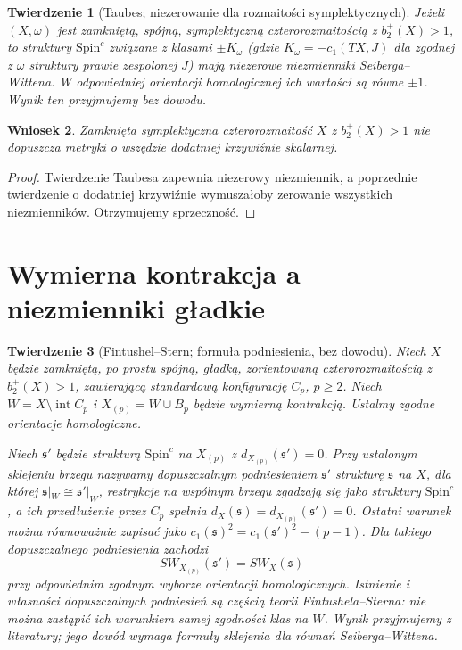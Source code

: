 \documentclass[11pt,a4paper]{report}
\numberwithin{equation}{section}
\theoremstyle{plain}
\newtheorem{twierdzenie}{Twierdzenie}[section]
\newtheorem{wniosek}[twierdzenie]{Wniosek}
\theoremstyle{definition}
\theoremstyle{remark}
\begin{document}
\begin{twierdzenie}[Taubes; niezerowanie dla rozmaitości symplektycznych]
\label{thm:tg-sw-taubes}
Jeżeli $(X,\omega)$ jest zamkniętą, spójną,
symplektyczną czterorozmaitością z $b_2^+(X)>1$,
to struktury $\mathrm{Spin}^c$ związane z klasami
$\pm K_\omega$ (gdzie $K_\omega=-c_1(TX,J)$ dla
zgodnej z $\omega$ struktury prawie zespolonej $J$)
mają niezerowe niezmienniki Seiberga--Wittena.
W odpowiedniej orientacji homologicznej ich wartości
są równe $\pm1$. Wynik ten przyjmujemy bez dowodu.
\end{twierdzenie}

\begin{wniosek}
Zamknięta symplektyczna czterorozmaitość
$X$ z $b_2^+(X)>1$ nie dopuszcza metryki o wszędzie
dodatniej krzywiźnie skalarnej.
\end{wniosek}

\begin{proof}
Twierdzenie Taubesa zapewnia niezerowy niezmiennik,
a poprzednie twierdzenie o dodatniej krzywiźnie
wymuszałoby zerowanie wszystkich niezmienników.
Otrzymujemy sprzeczność.
\end{proof}

\section{Wymierna kontrakcja a niezmienniki gładkie}
\label{sec:tg-sw-rb}

\begin{twierdzenie}[Fintushel--Stern; formuła podniesienia, bez dowodu]
\label{thm:tg-sw-rbprinciple}
Niech $X$ będzie zamkniętą, po prostu spójną,
gładką, zorientowaną czterorozmaitością z
$b_2^+(X)>1$, zawierającą standardową konfigurację
$C_p$, $p\geq2$. Niech $W=X\setminus\operatorname{int}C_p$
i $X_{(p)}=W\cup B_p$ będzie wymierną kontrakcją.
Ustalmy zgodne orientacje homologiczne.

Niech $\mathfrak s'$ będzie strukturą $\mathrm{Spin}^c$
na $X_{(p)}$ z $d_{X_{(p)}}(\mathfrak s')=0$.
Przy ustalonym sklejeniu brzegu nazywamy
\emph{dopuszczalnym podniesieniem} $\mathfrak s'$
strukturę $\mathfrak s$ na $X$, dla której
$\mathfrak s|_W\cong\mathfrak s'|_W$, restrykcje na
wspólnym brzegu zgadzają się jako struktury
$\mathrm{Spin}^c$, a ich przedłużenie przez $C_p$
spełnia $d_X(\mathfrak s)=d_{X_{(p)}}(\mathfrak s')=0$.
Ostatni warunek można równoważnie zapisać jako
$c_1(\mathfrak s)^2=c_1(\mathfrak s')^2-(p-1)$.
Dla takiego dopuszczalnego podniesienia zachodzi
\[
SW_{X_{(p)}}(\mathfrak s')=SW_X(\mathfrak s)
\]
przy odpowiednim zgodnym wyborze orientacji homologicznych.
Istnienie i własności dopuszczalnych podniesień są częścią
teorii Fintushela--Sterna: nie można zastąpić ich
warunkiem samej zgodności klas na $W$.
Wynik przyjmujemy z literatury; jego dowód wymaga
formuły sklejenia dla równań Seiberga--Wittena.
\end{twierdzenie}
\end{document}
